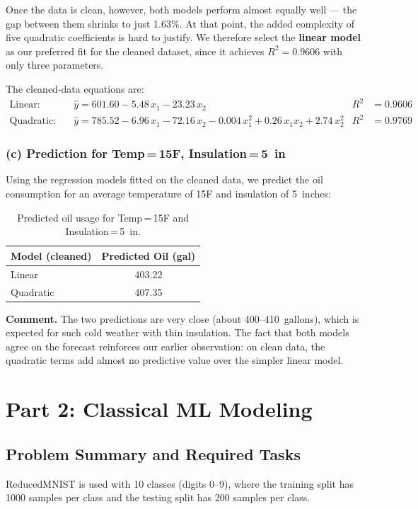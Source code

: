 \documentclass[12pt, a4paper]{article}
\begin{document}
Once the data is clean, however, both models perform almost equally well --- the gap between them shrinks to just 1.63\%.  At that point, the added complexity of five quadratic coefficients is hard to justify.  We therefore select the \textbf{linear model} as our preferred fit for the cleaned dataset, since it achieves $R^2 = 0.9606$ with only three parameters.

\medskip
The cleaned-data equations are:
\begin{align*}
\text{Linear:}    \quad & \hat{y} = 601.60 - 5.48\,x_1 - 23.23\,x_2 & R^2 &= 0.9606 \\
\text{Quadratic:} \quad & \hat{y} = 785.52 - 6.96\,x_1 - 72.16\,x_2 - 0.004\,x_1^2 + 0.26\,x_1 x_2 + 2.74\,x_2^2 \!\!\! & R^2 &= 0.9769
\end{align*}

\subsubsection{(c) Prediction for Temp\,=\,15\textdegree F, Insulation\,=\,5~in}

Using the regression models fitted on the cleaned data, we predict the oil consumption for an average temperature of 15\textdegree F and insulation of 5~inches:

\begin{table}[H]
\centering
\begin{tabular}{l|c}
\toprule
\textbf{Model (cleaned)} & Predicted Oil (gal) \\
\midrule
Linear    & 403.22 \\
Quadratic & 407.35 \\
\bottomrule
\end{tabular}
\caption{Predicted oil usage for Temp\,=\,15\textdegree F and Insulation\,=\,5~in.}
\end{table}

\noindent\textbf{Comment.}
The two predictions are very close (about 400--410~gallons), which is expected for such cold weather with thin insulation.  The fact that both models agree on the forecast reinforces our earlier observation: on clean data, the quadratic terms add almost no predictive value over the simpler linear model.

\section{Part 2: Classical ML Modeling}

\subsection{Problem Summary and Required Tasks}
ReducedMNIST is used with 10 classes (digits 0--9), where the training split has 1000 samples per class and the testing split has 200 samples per class.
\end{document}
